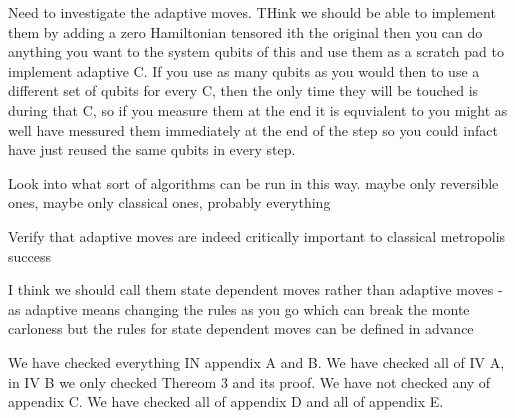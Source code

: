 Need to investigate the adaptive moves. THink we should be able to implement them by adding a zero Hamiltonian tensored ith the original then you can do anything you want to the system qubits of this and use them as a scratch pad to implement adaptive C. If you use as many qubits as you would then to use a different set of qubits for every C, then the only time they will be touched is during that C, so if you measure them at the end it is equvialent to you might as well have messured them immediately at the end of the step so you could infact have just reused the same qubits in every step.

Look into what sort of algorithms can be run in this way. maybe only reversible ones, maybe only classical ones, probably everything

Verify that adaptive moves are indeed critically important to classical metropolis success


I think we should call them state dependent moves rather than adaptive moves - as adaptive means changing the rules as you go which can break the monte carloness but the rules for state dependent moves can be defined in advance


We have checked everything IN appendix A and B. We have checked all of IV A, in IV B we only checked Thereom 3 and its proof. We have not checked any of appendix C. We have checked all of appendix D and all of appendix E.
